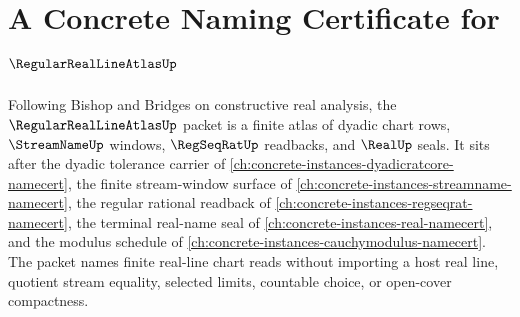 \chapter{A Concrete Naming Certificate for $\RegularRealLineAtlasUp$}
\label{ch:concrete-instances-regular-real-line-atlas-namecert}

Following Bishop and Bridges on constructive real analysis, the $\RegularRealLineAtlasUp$ packet is a finite atlas of dyadic chart rows, $\StreamNameUp$ windows, $\RegSeqRatUp$ readbacks, and $\RealUp$ seals. It sits after the dyadic tolerance carrier of \autoref{ch:concrete-instances-dyadicratcore-namecert}, the finite stream-window surface of \autoref{ch:concrete-instances-streamname-namecert}, the regular rational readback of \autoref{ch:concrete-instances-regseqrat-namecert}, the terminal real-name seal of \autoref{ch:concrete-instances-real-namecert}, and the modulus schedule of \autoref{ch:concrete-instances-cauchymodulus-namecert}. The packet names finite real-line chart reads without importing a host real line, quotient stream equality, selected limits, countable choice, or open-cover compactness.

